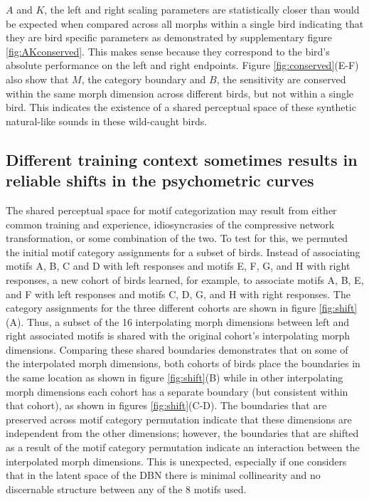 $A$ and $K$, the left and right scaling parameters are statistically closer than would be expected when compared across all morphs within a single bird indicating that they are bird specific parameters as demonstrated by supplementary figure \ref{fig:AKconserved}. This makes sense because they correspond to the bird's absolute performance on the left and right endpoints. Figure \ref{fig:conserved}(E-F) also show that $M$, the category boundary and $B$, the sensitivity are conserved within the same morph dimension across different birds, but not within a single bird. This indicates the existence of a shared perceptual space of these synthetic natural-like sounds in these wild-caught birds. 

\subsection{Different training context sometimes results in reliable shifts in the psychometric curves}



The shared perceptual space for motif categorization may result from either common training and experience, idiosyncrasies of the compressive network transformation, or some combination of the two. To test for this, we permuted the initial motif category assignments for a subset of birds. Instead of associating motifs A, B, C and D with left responses and motifs E, F, G, and H with right responses, a new cohort of birds learned, for example, to associate motifs A, B, E, and F with left responses and motifs C, D, G, and H with right responses. The category assignments for the three different cohorts are shown in figure \ref{fig:shift}(A). Thus, a subset of the 16 interpolating morph dimensions between left and right associated motifs is shared with the original cohort's interpolating morph dimensions. Comparing these shared boundaries demonstrates that on some of the interpolated morph dimensions, both cohorts of birds place the boundaries in the same location as shown in figure \ref{fig:shift}(B) while in other interpolating morph dimensions each cohort has a separate boundary (but consistent within that cohort), as shown in figures \ref{fig:shift}(C-D). The boundaries that are preserved across motif category permutation indicate that these dimensions are independent from the other dimensions; however, the boundaries that are shifted as a result of the motif category permutation indicate an interaction between the interpolated morph dimensions. This is unexpected, especially if one considers that in the latent space of the DBN there is minimal collinearity and no discernable structure between any of the 8 motifs used.


